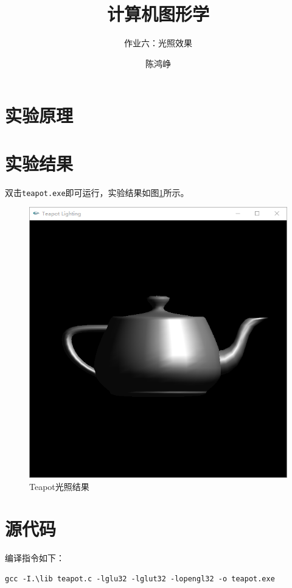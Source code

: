 \documentclass[logo,reportComp]{thesis}
\title{计算机图形学}
\subtitle{作业六：光照效果}
\author{陈鸿峥}
\begin{document}
\maketitle

\section{实验原理}

\section{实验结果}
双击\verb'teapot.exe'即可运行，实验结果如图\ref{fig:teapot}所示。
\begin{figure}[H]
\centering
\includegraphics[width=0.6\linewidth]{fig/result.png}
\caption{Teapot光照结果}
\label{fig:teapot}
\end{figure}

\appendixconfig
\appendix
\section{源代码}


编译指令如下：
\begin{flushleft}
\verb'gcc -I.\lib teapot.c -lglu32 -lglut32 -lopengl32 -o teapot.exe'
\end{flushleft}
\end{document}
